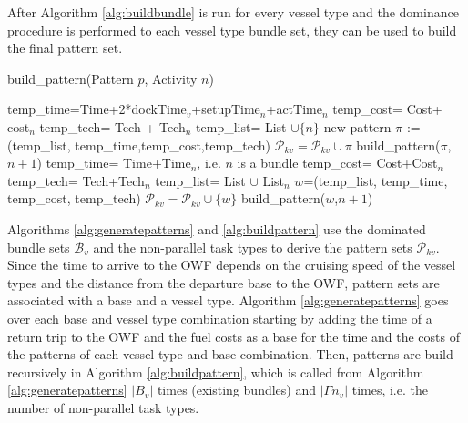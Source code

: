 After Algorithm \ref{alg:buildbundle} is run for every vessel type and the dominance procedure is performed to each vessel type bundle set, they can be used to build the final pattern set.
\begin{algorithm}[h]
	\caption{build\_pattern(Pattern $p$, Activity $n$)}
	\label{alg:buildpattern}
	\begin{algorithmic}
		\medskip
		\STATE temp\_time=Time+2*dockTime$_v$+setupTime$_n$+actTime$_n$
		\STATE temp\_cost= Cost+ cost$_n$
		\STATE temp\_tech= Tech + Tech$_n$
		\STATE temp\_list= List $\cup \{n\}$
		\STATE new pattern $\pi$ := (temp\_list, temp\_time,temp\_cost,temp\_tech)
		\STATE $\mathcal{P}_{kv}= \mathcal{P}_{kv}\cup \pi$
		\STATE build\_pattern($\pi$,$n+1$)
		\ENDIF
		\ELSE
		\STATE temp\_time= Time+Time$_n$, i.e. $n$ is a bundle
		\STATE temp\_cost= Cost+Cost$_n$
		\STATE temp\_tech= Tech+Tech$_n$
		\STATE temp\_list= List $\cup$ List$_n$
		\STATE $w$=(temp\_list, temp\_time, temp\_cost, temp\_tech)
		\STATE $\mathcal{P}_{kv}= \mathcal{P}_{kv}\cup \{w\}$
		\STATE build\_pattern($w$,$n+1$)
		\ENDIF
		\ENDIF
	\end{algorithmic}
\end{algorithm}
Algorithms \ref{alg:generatepatterns} and \ref{alg:buildpattern} use the dominated bundle sets $\mathcal B_v$ and the non-parallel task types to derive the pattern sets $\mathcal P_{kv}$. Since the time to arrive to the OWF depends on the cruising speed of the vessel types and the distance from the departure base to the OWF, pattern sets are associated with a base and a vessel type. Algorithm \ref{alg:generatepatterns} goes over each base and vessel type combination starting by adding the time of a return trip to the OWF and the fuel costs as a base for the time and the costs of the patterns of each vessel type and base combination. Then, patterns are build recursively in Algorithm \ref{alg:buildpattern}, which is called from Algorithm \ref{alg:generatepatterns} $|B_v|$ times (existing bundles) and $|\Gamma n_v|$ times, i.e. the number of non-parallel task types.





